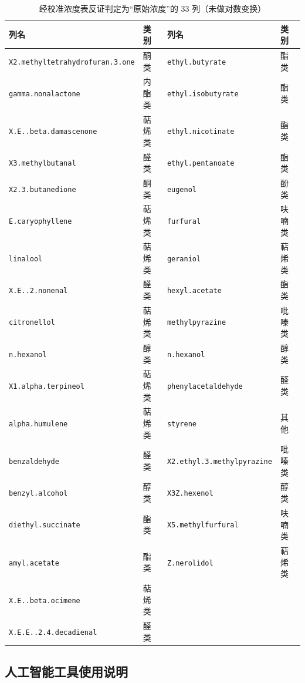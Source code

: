 \begin{table}[H]
\centering
\caption{经校准浓度表反证判定为“原始浓度”的 33 列（未做对数变换）}
\label{tab:rawall}
\scriptsize
\begin{fittable}
\begin{tabular}{@{}llll@{}}
\toprule
列名 & 类别 & 列名 & 类别 \\
\midrule
\texttt{X2.methyltetrahydrofuran.3.one} & 酮类 & \texttt{ethyl.butyrate} & 酯类 \\
\texttt{gamma.nonalactone} & 内酯类 & \texttt{ethyl.isobutyrate} & 酯类 \\
\texttt{X.E..beta.damascenone} & 萜烯类 & \texttt{ethyl.nicotinate} & 酯类 \\
\texttt{X3.methylbutanal} & 醛类 & \texttt{ethyl.pentanoate} & 酯类 \\
\texttt{X2.3.butanedione} & 酮类 & \texttt{eugenol} & 酚类 \\
\texttt{E.caryophyllene} & 萜烯类 & \texttt{furfural} & 呋喃类 \\
\texttt{linalool} & 萜烯类 & \texttt{geraniol} & 萜烯类 \\
\texttt{X.E..2.nonenal} & 醛类 & \texttt{hexyl.acetate} & 酯类 \\
\texttt{citronellol} & 萜烯类 & \texttt{methylpyrazine} & 吡嗪类 \\
\texttt{n.hexanol} & 醇类 & \texttt{n.hexanol} & 醇类 \\
\texttt{X1.alpha.terpineol} & 萜烯类 & \texttt{phenylacetaldehyde} & 醛类 \\
\texttt{alpha.humulene} & 萜烯类 & \texttt{styrene} & 其他 \\
\texttt{benzaldehyde} & 醛类 & \texttt{X2.ethyl.3.methylpyrazine} & 吡嗪类 \\
\texttt{benzyl.alcohol} & 醇类 & \texttt{X3Z.hexenol} & 醇类 \\
\texttt{diethyl.succinate} & 酯类 & \texttt{X5.methylfurfural} & 呋喃类 \\
\texttt{amyl.acetate} & 酯类 & \texttt{Z.nerolidol} & 萜烯类 \\
\texttt{X.E..beta.ocimene} & 萜烯类 & & \\
\texttt{X.E.E..2.4.decadienal} & 醛类 & & \\
\bottomrule
\end{tabular}
\end{fittable}
\end{table}

\subsection{人工智能工具使用说明}

